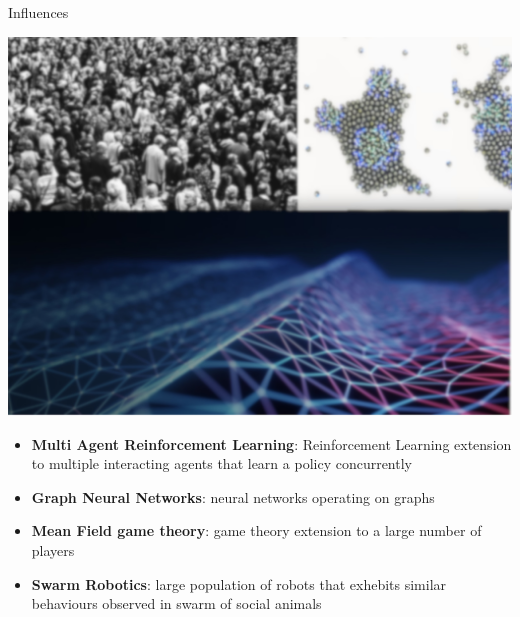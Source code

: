 \begin{frame}{\playfairblack Influences}
  \begin{backgroundblock} 
    \includegraphics[width=\paperwidth]{img/background} 
  \end{backgroundblock} 
  \begin{card}
    \begin{itemize}
      \item \textbf{Multi Agent Reinforcement Learning}: Reinforcement Learning extension to multiple interacting agents that learn a policy concurrently
      \item \textbf{Graph Neural Networks}: neural networks operating on graphs
      \item \textbf{Mean Field game theory}: game theory extension to a large number of players
      \item \textbf{Swarm Robotics}: large population of robots that exhebits similar behaviours observed in swarm of social animals
    \end{itemize}
  \end{card}
\end{frame}